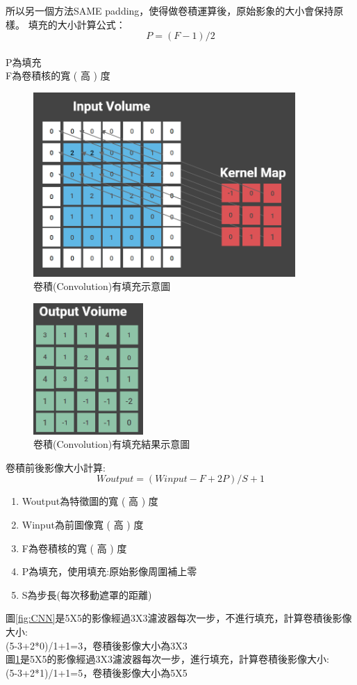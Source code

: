 所以另一個方法SAME padding，使得做卷積運算後，原始影象的大小會保持原樣。
填充的大小計算公式：
\begin{equation}
	\label{equ:padding}
	P=(F-1)/2
\end{equation}
\\

P為填充\\
F為卷積核的寬 ( 高 ) 度
\begin{figure}[H]
	\centerline{\includegraphics[height=7cm]{pic/samepadding.PNG}}
	\caption{卷積(Convolution)有填充示意圖}
	\label{fig:samepadding}
\end{figure}
\begin{figure}[H]
	\centerline{\includegraphics[height=5cm]{pic/samepaddingout.PNG}}
	\caption{卷積(Convolution)有填充結果示意圖}
	\label{fig:samepaddingout}
\end{figure}


卷積前後影像大小計算:
\begin{equation}
	\label{equ:mi}
	Woutput=(Winput-F+2P)/S+1
\end{equation}

\begin{enumerate}
	\item
	      Woutput為特徵圖的寬 ( 高 ) 度
	\item
	      Winput為前圖像寬 ( 高 ) 度
	\item
	      F為卷積核的寬 ( 高 ) 度
	\item
	      P為填充，使用填充:原始影像周圍補上零
	\item
	      S為步長(每次移動遮罩的距離)
\end{enumerate}
圖\ref{fig:CNN}是5X5的影像經過3X3濾波器每次一步，不進行填充，計算卷積後影像大小:\\
(5-3+2*0)/1+1=3，卷積後影像大小為3X3\\
圖\ref{fig:samepadding}是5X5的影像經過3X3濾波器每次一步，進行填充，計算卷積後影像大小:\\
(5-3+2*1)/1+1=5，卷積後影像大小為5X5




